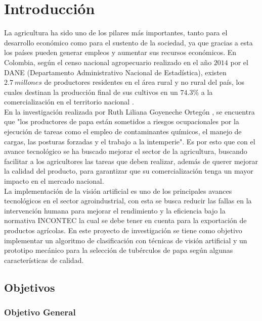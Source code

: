 \cleardoublepage %

\chapter{Introducción}

La agricultura ha sido uno de los pilares más importantes, tanto para el desarrollo económico como para el sustento de la sociedad, ya que gracias a esta los países pueden generar empleos y aumentar sus recursos económicos. En Colombia, según el censo nacional agropecuario realizado en el año $2014$ por el DANE (Departamento Administrativo Nacional de Estadística), existen $2.7 \ millones$ de productores residentes en el área rural y no rural del país, los cuales destinan la producción final de sus cultivos en un $74.3 \%$ a la comercialización en el territorio nacional \cite{Dane2016}.\\

En la investigación realizada por Ruth Liliana Goyeneche Ortegón \cite{goyeneche2015miradas}, se encuentra que "los productores de papa están sometidos a riesgos ocupacionales por la ejecución de tareas como el empleo de contaminantes químicos, el manejo de cargas, las posturas forzadas y el trabajo a la intemperie". Es por esto que con el avance tecnológico se ha buscado mejorar el sector de la agricultura, buscando facilitar a los agricultores las tareas que deben realizar, además de querer mejorar la calidad del producto, para garantizar que su comercialización tenga un mayor impacto en el mercado nacional.\\

La implementación de la visión artificial es uno de los principales avances tecnológicos en el sector agroindustrial, con esta se busca reducir las fallas en la intervención humana para mejorar el rendimiento y la eficiencia bajo la normativa INCONTEC la cual se debe tener en cuenta para la exportación de productos agrícolas. En este proyecto de investigación se tiene como objetivo implementar un algoritmo de clasificación con técnicas de visión artificial y un prototipo mecánico para la selección de tubérculos de papa según algunas características de calidad.



\newpage
\section{Objetivos}

\subsection{Objetivo General}

